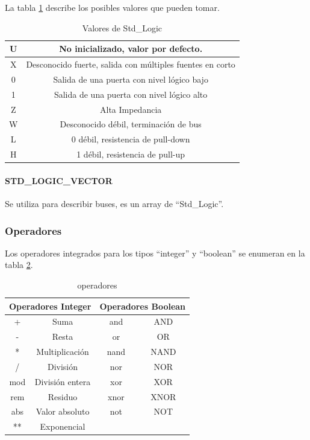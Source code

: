La tabla \ref{std_logic} describe los posibles valores que pueden tomar.

\begin{table}[!hbt] 
\centering
 \begin{tabular}{|c|c|}
\hline
U & No inicializado, valor por defecto. \\ \hline
X & Desconocido fuerte, salida con múltiples fuentes en corto \\ \hline
0 & Salida de una puerta con nivel lógico bajo \\ \hline
1 & Salida de una puerta con nivel lógico alto \\ \hline
Z & Alta Impedancia \\ \hline
W & Desconocido débil, terminación de bus \\ \hline
L & 0 débil, resistencia de pull-down \\ \hline
H & 1 débil, resistencia de pull-up \\ \hline
\end{tabular}
  \caption{Valores de Std\_Logic}
  \label{std_logic}
  
\end{table}      

\paragraph{STD\_LOGIC\_VECTOR}
Se utiliza para describir buses, es un array de ``Std\_Logic''.

\subsubsection{Operadores}
Los operadores integrados para los tipos ``integer'' y ``boolean'' se enumeran en la tabla \ref{operadores}.

\begin{table}[!hbt] 
\centering
 \begin{tabular}{|c|c|c|c|}
\hline
\multicolumn{2}{|c|}{\textbf{Operadores Integer}} & \multicolumn{2}{|c|}{\textbf{Operadores Boolean}}\\ \hline
+   & Suma               & and   & AND  \\ \hline
-   & Resta              & or    & OR   \\ \hline
*   & Multiplicación     & nand  & NAND \\ \hline
/   & División           & nor   & NOR  \\ \hline
mod & División entera    & xor   & XOR  \\ \hline
rem & Residuo            & xnor  & XNOR \\ \hline
abs & Valor absoluto     & not   & NOT  \\ \hline
**  & Exponencial        &       &      \\ \hline


\end{tabular}
  \caption{operadores}
  \label{operadores}
  
\end{table}    

